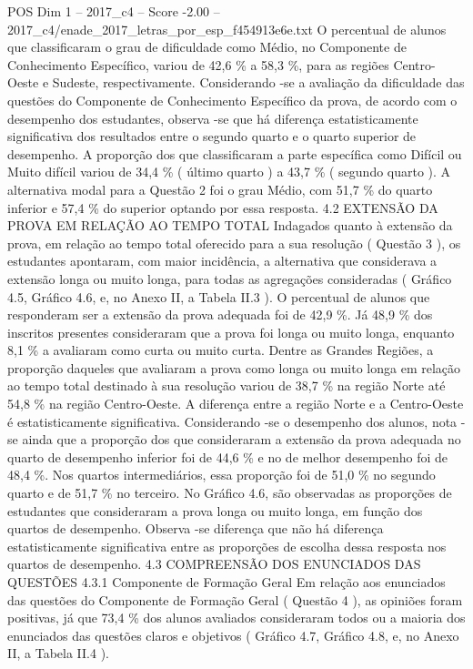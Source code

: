\begin{textsample}{POS Dim 1 – 2017\_c4 – Score -2.00 – 2017\_c4/enade\_2017\_letras\_por\_esp\_f454913e6e.txt}
O percentual de alunos que classificaram o grau de dificuldade como Médio, no Componente de Conhecimento Específico, variou de 42,6 \% a 58,3 \%, para as regiões Centro-Oeste e Sudeste, respectivamente.
Considerando -se a avaliação da dificuldade das questões do Componente de Conhecimento Específico da prova, de acordo com o desempenho dos estudantes, observa -se que há diferença estatisticamente significativa dos resultados entre o segundo quarto e o quarto superior de desempenho.
A proporção dos que classificaram a parte específica como Difícil ou Muito difícil variou de 34,4 \% ( último quarto ) a 43,7 \% ( segundo quarto ).
A alternativa modal para a Questão 2 foi o grau Médio, com 51,7 \% do quarto inferior e 57,4 \% do superior optando por essa resposta. 4.2 EXTENSÃO DA PROVA EM RELAÇÃO AO TEMPO TOTAL Indagados quanto à extensão da prova, em relação ao tempo total oferecido para a sua resolução ( Questão 3 ), os estudantes apontaram, com maior incidência, a alternativa que considerava a extensão longa ou muito longa, para todas as agregações consideradas ( Gráfico 4.5, Gráfico 4.6, e, no Anexo II, a Tabela II.3 ).
O percentual de alunos que responderam ser a extensão da prova adequada foi de 42,9 \%.
Já 48,9 \% dos inscritos presentes consideraram que a prova foi longa ou muito longa, enquanto 8,1 \% a avaliaram como curta ou muito curta.
Dentre as Grandes Regiões, a proporção daqueles que avaliaram a prova como longa ou muito longa em relação ao tempo total destinado à sua resolução variou de 38,7 \% na região Norte até 54,8 \% na região Centro-Oeste.
A diferença entre a região Norte e a Centro-Oeste é estatisticamente significativa.
Considerando -se o desempenho dos alunos, nota -se ainda que a proporção dos que consideraram a extensão da prova adequada no quarto de desempenho inferior foi de 44,6 \% e no de melhor desempenho foi de 48,4 \%.
Nos quartos intermediários, essa proporção foi de 51,0 \% no segundo quarto e de 51,7 \% no terceiro.
No Gráfico 4.6, são observadas as proporções de estudantes que consideraram a prova longa ou muito longa, em função dos quartos de desempenho.
Observa -se diferença que não há diferença estatisticamente significativa entre as proporções de escolha dessa resposta nos quartos de desempenho. 4.3 COMPREENSÃO DOS ENUNCIADOS DAS QUESTÕES 4.3.1 Componente de Formação Geral Em relação aos enunciados das questões do Componente de Formação Geral ( Questão 4 ), as opiniões foram positivas, já que 73,4 \% dos alunos avaliados consideraram todos ou a maioria dos enunciados das questões claros e objetivos ( Gráfico 4.7, Gráfico 4.8, e, no Anexo II, a Tabela II.4 ).

\end{textsample}
